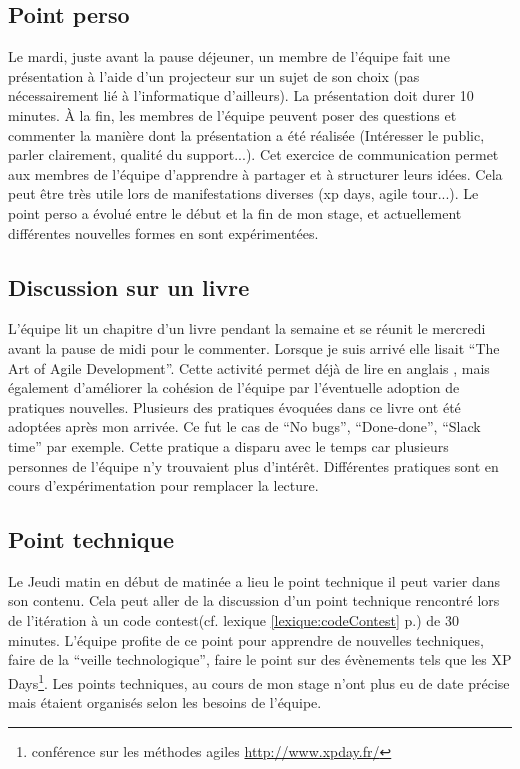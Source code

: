 \subsection*{Point perso}
Le mardi, juste avant la pause déjeuner, un membre de l'équipe fait une présentation à l'aide d'un projecteur sur un sujet de son choix (pas nécessairement lié à l'informatique d'ailleurs). La présentation doit durer 10 minutes. À la fin, les membres de l'équipe peuvent poser des questions et commenter la manière dont la présentation a été réalisée (Intéresser le public, parler clairement, qualité du support...). Cet exercice de communication permet aux membres de l'équipe d'apprendre à partager et à structurer leurs idées. Cela peut être très utile lors de manifestations diverses (xp days, agile tour...). Le point perso a évolué entre le début et la fin de mon stage, et actuellement différentes nouvelles formes en sont expérimentées.
\subsection*{Discussion sur un livre}
L'équipe lit un chapitre d'un livre pendant la semaine et se réunit le mercredi avant la pause de midi pour le commenter. Lorsque je suis arrivé elle lisait ``The Art of Agile Development''. Cette activité permet déjà de lire en anglais , mais également d'améliorer la cohésion de l'équipe par l'éventuelle adoption de pratiques nouvelles. Plusieurs des pratiques évoquées dans ce livre ont été adoptées après mon arrivée. Ce fut le cas de ``No bugs'', ``Done-done'', ``Slack time'' par exemple. Cette pratique a disparu avec le temps car plusieurs personnes de l'équipe n'y trouvaient plus d'intérêt. Différentes pratiques sont en cours d'expérimentation pour remplacer la lecture.
\subsection*{Point technique}
Le Jeudi matin en début de matinée a lieu le point technique il peut varier dans son contenu. Cela peut aller de la discussion d'un point technique rencontré lors de l'itération à un code contest(cf. lexique \ref{lexique:codeContest} p.\pageref{lexique:codeContest}) de 30 minutes. L'équipe profite de ce point pour apprendre de nouvelles techniques, faire de la ``veille technologique'', faire le point sur des évènements tels que les XP Days\footnote{conférence sur les méthodes agiles \url{http://www.xpday.fr/}}. Les points techniques, au cours de mon stage n'ont plus eu de date précise mais étaient organisés selon les besoins de l'équipe.

